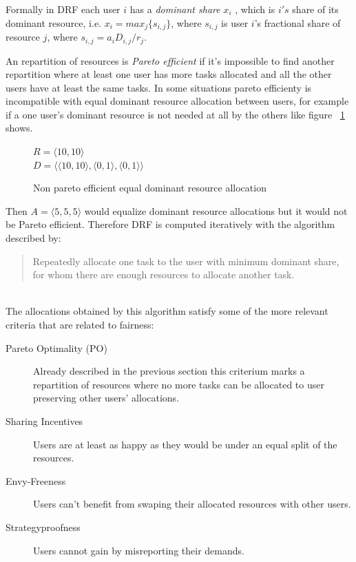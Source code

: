 \documentclass{svjour3}                     %
\begin{document}
Formally in DRF each user $i$ has a \emph{dominant share} $x_{i}$ ,
which is $i's$ share of its dominant resource, i.e. $x_{i} = max_{j}\{s_{i,j}\}$,
where $s_{i,j}$ is user $i$'s fractional share of resource $j$, where
$s_{i,j} = a_{i}D_{i,j}/r_{j}$.

An repartition of resources is \emph{Pareto efficient} if it's impossible
to find another repartition where at least one user has more tasks
allocated and all the other users have at least the same tasks. In some 
situations pareto efficienty is incompatible with equal dominant resource
allocation between users, for example if a one user's dominant resource
is not needed at all by the others like figure ~\ref{fig:nonpareto} shows. \\

\begin{figure}[!ht]
\centering
$R = \langle 10, 10 \rangle$ \\
$D = \langle \langle 10, 10 \rangle, \langle 0, 1 \rangle, \langle 0, 1 \rangle \rangle$ \\
\caption{Non pareto efficient equal dominant resource allocation}
\label{fig:nonpareto}
\end{figure}

Then $A = \langle 5, 5, 5 \rangle$ would equalize dominant resource
allocations but it would not be Pareto efficient. Therefore DRF is computed
iteratively with the algorithm described by: \\

\blockquote{Repeatedly allocate one task to the user with minimum dominant
share, for whom there are enough resources to allocate another task.} \\

The allocations obtained by this algorithm satisfy some of the more
relevant criteria that are related to fairness: \\

\begin{description}
  \item[Pareto Optimality (PO)] Already described in the previous
  section this criterium marks a repartition of resources where
  no more tasks can be allocated to user preserving other users'
  allocations.
  \item[Sharing Incentives]  Users are at least as happy as they
  would be under an equal split of the resources.
  \item[Envy-Freeness] Users can't benefit from swaping their
  allocated resources with other users.
  \item[Strategyproofness] Users cannot gain by misreporting
  their demands.
\end{description}
\end{document}
